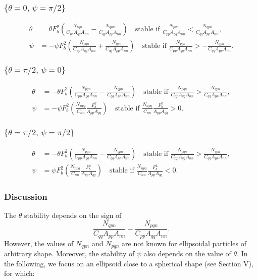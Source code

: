 \documentclass[12pt]{My_preprint}
\begin{document}
\subsubsection{$\{\theta = 0, \, \psi = \pi/2\}$}
\begin{align}
    \dot \theta  &=  \theta F_b^2 \left(\frac{N_{pqn}}{C_{pp}A_{qq} A_{nn}} - \frac{N_{qpn}}{C_{qq}A_{pp} A_{nn}}\right) \quad \text{stable if $\frac{N_{pqn}}{C_{pp}A_{qq} A_{nn}}$} <\frac{N_{qpn}}{C_{qq}A_{pp} A_{nn}}, \\
    \dot \psi   &=  -\psi F_b^2 \left(\frac{N_{pqn}}{C_{pp}A_{qq} A_{nn}}+\frac{N_{qpn}}{C_{qq}A_{pp} A_{nn}}\right) \quad \text{stable if $\frac{N_{pqn}}{C_{pp}A_{qq} A_{nn}}  > -\frac{N_{qpn}}{C_{qq}A_{pp} A_{nn}}$}.
\end{align}
\subsubsection{$\{\theta = \pi/2, \, \psi = 0\}$}
\begin{align}
    \dot \theta  &=  -\theta F_b^2 \left(\frac{N_{pqn}}{C_{pp}A_{qq} A_{nn}} - \frac{N_{qpn}}{C_{qq}A_{pp} A_{nn}}\right)\quad \text{stable if $\frac{N_{pqn}}{C_{pp}A_{qq} A_{nn}}$} >\frac{N_{qpn}}{C_{qq}A_{pp} A_{nn}}, \\
    \dot \psi   &= -\psi F_b^2 \left(\frac{N_{npq}}{C_{nn}}\frac{F_b^2}{A_{pp} A_{qq}}\right)\quad \text{stable if $\frac{N_{npq}}{C_{nn}}\frac{F_b^2}{A_{pp} A_{qq}}>0$}.
\end{align}
\subsubsection{$\{\theta = \pi/2, \, \psi = \pi/2\}$}
\begin{align}
    \dot \theta  &=  -\theta F_b^2 \left(\frac{N_{pqn}}{C_{pp}A_{qq} A_{nn}} - \frac{N_{qpn}}{C_{qq}A_{pp} A_{nn}}\right)\quad \text{stable if $\frac{N_{pqn}}{C_{pp}A_{qq} A_{nn}}$} >\frac{N_{qpn}}{C_{qq}A_{pp} A_{nn}}, \\
    \dot \psi   &= \psi F_b^2 \left(\frac{N_{npq}}{C_{nn}}\frac{F_b^2}{A_{pp} A_{qq}}\right)\quad \text{stable if $\frac{N_{npq}}{C_{nn}}\frac{F_b^2}{A_{pp} A_{qq}}<0$}.
\end{align}

\subsubsection{Discussion}

The $\theta$ stability depends on the sign of
\begin{equation}
\frac{N_{qpn}}{C_{qq} A_{pp} A_{nn}} - \frac{N_{pqn}}{C_{pp} A_{qq} A_{nn}} .
\end{equation}
However, the values of $N_{qpn}$ and $N_{pqn}$ are not known for ellipsoidal particles of arbitrary shape.
Moreover, the stability of $\psi$ also depends on the value of $\theta$.
In the following, we focus on an ellipsoid close to a spherical shape (see Section V), for which:
\end{document}
